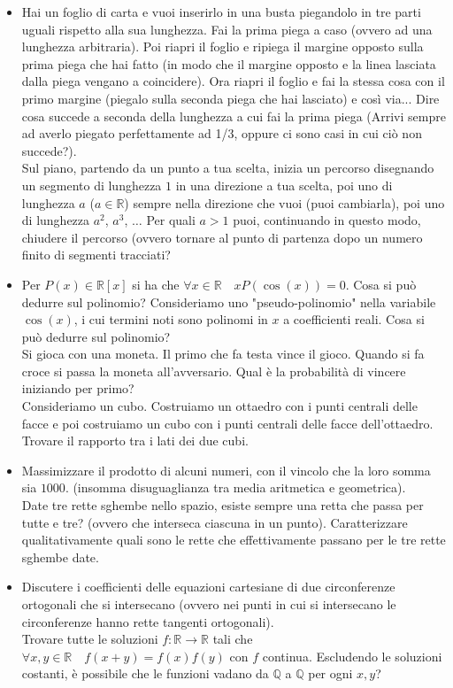 \documentclass[a4paper,11pt]{article}
\newcommand{\QQ}{\mathbb{Q}}
\newcommand{\RR}{\mathbb{R}}
\begin{document}
\begin{itemize}
\item Hai un foglio di carta e vuoi inserirlo in una busta piegandolo in tre parti uguali rispetto alla sua lunghezza. Fai la prima piega a caso (ovvero ad una lunghezza arbitraria). Poi riapri il foglio e ripiega il margine opposto sulla prima piega che hai fatto (in modo che il margine opposto e la linea lasciata dalla piega vengano a coincidere). Ora riapri il foglio e fai la stessa cosa con il primo margine (piegalo sulla seconda piega che hai lasciato) e cos\`i via... Dire cosa succede a seconda della lunghezza a cui fai la prima piega (Arrivi sempre ad averlo piegato perfettamente ad 1/3, oppure ci sono casi in cui ci\`o non succede?). \\ Sul piano, partendo da un punto a tua scelta, inizia un percorso disegnando un segmento di lunghezza $1$ in una direzione a tua scelta, poi uno di lunghezza $a$ ($a \in \RR$) sempre nella direzione che vuoi (puoi cambiarla), poi uno di lunghezza $a^2$, $a^3$, $\ldots$ Per quali $a > 1$ puoi, continuando in questo modo, chiudere il percorso (ovvero tornare al punto di partenza dopo un numero finito di segmenti tracciati?
\item Per $P(x) \in \RR [x]$ si ha che $\forall x \in \RR \quad x P(\cos(x)) = 0$. Cosa si pu\`o dedurre sul polinomio? Consideriamo uno "pseudo-polinomio" nella variabile $\cos(x)$, i cui termini noti sono polinomi in $x$ a coefficienti reali. Cosa si pu\`o dedurre sul polinomio? \\ Si gioca con una moneta. Il primo che fa testa vince il gioco. Quando si fa croce si passa la moneta all'avversario. Qual \`e la probabilit\`a di vincere iniziando per primo? \\ Consideriamo un cubo. Costruiamo un ottaedro con i punti centrali delle facce e poi costruiamo un cubo con i punti centrali delle facce dell'ottaedro. Trovare il rapporto tra i lati dei due cubi.
\item Massimizzare il prodotto di alcuni numeri, con il vincolo che la loro somma sia $1000$. (insomma disuguaglianza tra media aritmetica e geometrica). \\ Date tre rette sghembe nello spazio, esiste sempre una retta che passa per tutte e tre? (ovvero che interseca ciascuna in un punto). Caratterizzare qualitativamente quali sono le rette che effettivamente passano per le tre rette sghembe date.
\item Discutere i coefficienti delle equazioni cartesiane di due circonferenze ortogonali che si intersecano (ovvero nei punti in cui si intersecano le circonferenze hanno rette tangenti ortogonali). \\ Trovare tutte le soluzioni $f: \RR \rightarrow \RR$ tali che $\forall x,y \in \RR \quad f(x+y) = f(x)f(y)$ con $f$ continua. Escludendo le soluzioni costanti, \`e possibile che le funzioni vadano da $\QQ$ a $\QQ$ per ogni $x,y$?

\end{itemize}
\end{document}
